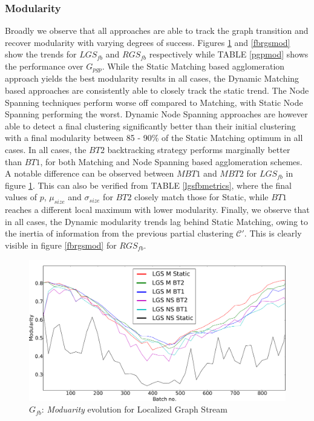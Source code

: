 \documentclass[conference]{IEEEtran}
\begin{document}
\subsubsection{Modularity}
Broadly we observe that all approaches are able to track the graph 
transition and recover modularity with varying degrees of success. Figures 
\ref{fblgsmod} and \ref{fbrgsmod} show the trends for $LGS_{fb}$ and $RGS_{fb}$ 
respectively while TABLE \ref{pgpmod} shows the performance over 
$G_{pgp}$. While the Static Matching based agglomeration approach yields the 
best modularity results in all cases, the Dynamic Matching based approaches are 
consistently able to closely track the static trend. The Node 
Spanning techniques perform worse off compared to Matching, with Static Node 
Spanning performing the worst. Dynamic Node Spanning approaches are however 
able to detect a final clustering significantly better than their initial 
clustering with a final modularity between 85 - 90\% of the Static Matching 
optimum in all cases. In all cases, the $BT2$ backtracking strategy performs 
marginally better than $BT1$, for both Matching and Node Spanning based 
agglomeration schemes. A notable difference can be observed between $M BT1$ and 
$M BT2$ for $LGS_{fb}$ in figure \ref{fblgsmod}. This can also be verified from 
TABLE \ref{lgsfbmetrics}, where the final values of $p$, $\mu_{size}$ and 
$\sigma_{size}$ for $BT2$ closely match those for Static, while $BT1$ reaches 
a different local maximum with lower modularity. Finally, we observe that in 
all cases, the Dynamic modularity trends lag behind Static Matching, owing to 
the inertia of information from the previous partial clustering $\mathcal{C'}$. 
This is clearly visible in figure \ref{fbrgsmod} for $RGS_{fb}$.
\begin{figure}
\centering \includegraphics[width=\textwidth]{fb_lgs_mod.pdf}
\vspace{-0.5cm}
\caption{\label{fblgsmod} $G_{fb}$: \emph{Moduarity} evolution for 
Localized Graph Stream\vspace{-0.5cm}}
\end{figure}
\end{document}
